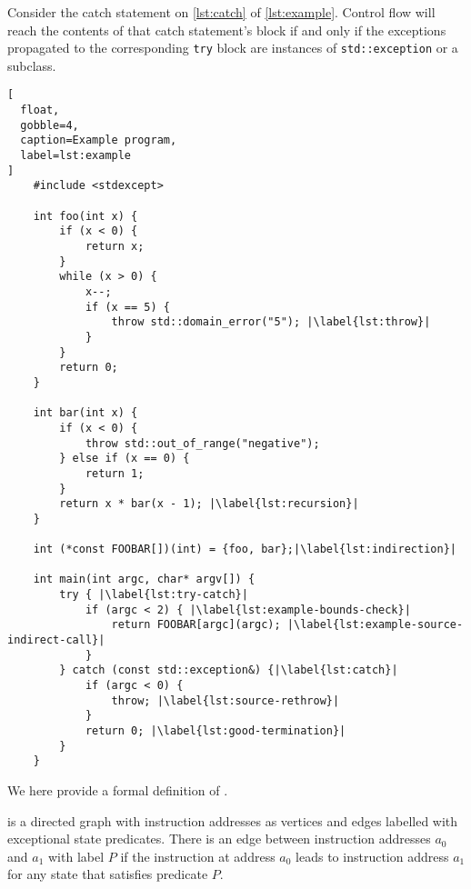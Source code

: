 \begin{example}
  Consider the catch statement on \cref{lst:catch} of \cref{lst:example}.
  Control flow will reach the contents of that catch statement's block if and only if the exceptions propagated to the corresponding \lstinline|try| block are instances of \lstinline|std::exception| or a subclass.
\end{example}
\begin{lstlisting}[
  float,
  gobble=4,
  caption=Example program,
  label=lst:example
]
    #include <stdexcept>

    int foo(int x) {
        if (x < 0) {
            return x;
        }
        while (x > 0) {
            x--;
            if (x == 5) {
                throw std::domain_error("5"); |\label{lst:throw}|
            }
        }
        return 0;
    }

    int bar(int x) {
        if (x < 0) {
            throw std::out_of_range("negative");
        } else if (x == 0) {
            return 1;
        }
        return x * bar(x - 1); |\label{lst:recursion}|
    }

    int (*const FOOBAR[])(int) = {foo, bar};|\label{lst:indirection}|

    int main(int argc, char* argv[]) {
        try { |\label{lst:try-catch}|
            if (argc < 2) { |\label{lst:example-bounds-check}|
                return FOOBAR[argc](argc); |\label{lst:example-source-indirect-call}|
            }
        } catch (const std::exception&) {|\label{lst:catch}|
            if (argc < 0) {
                throw; |\label{lst:source-rethrow}|
            }
            return 0; |\label{lst:good-termination}|
        }
    }
\end{lstlisting}

We here provide a formal definition of .
\begin{definition}[EICFGs]\label{def:eicfg}
   is a directed graph with instruction addresses as vertices and edges labelled with exceptional state predicates.
  There is an edge between instruction addresses $a_0$ and $a_1$ with label $P$ if the instruction at address $a_0$ leads to instruction address $a_1$ for any state that satisfies predicate $P$.
\end{definition}

